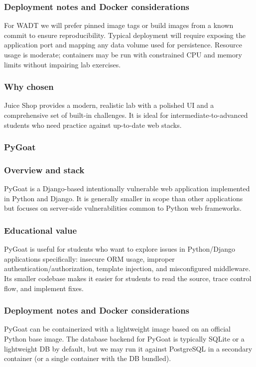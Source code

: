 \documentclass[12pt,titlepage]{article}
\begin{document}
\subsubsection*{Deployment notes and Docker considerations}
For WADT we will prefer pinned image tags or build images from a known commit to ensure reproducibility. Typical deployment will require exposing the application port and mapping any data volume used for persistence. Resource usage is moderate; containers may be run with constrained CPU and memory limits without impairing lab exercises.

\subsubsection*{Why chosen}
Juice Shop provides a modern, realistic lab with a polished UI and a comprehensive set of built-in challenges. It is ideal for intermediate-to-advanced students who need practice against up-to-date web stacks.


\subsubsection{PyGoat}

\subsubsection*{Overview and stack}
PyGoat is a Django-based intentionally vulnerable web application implemented in Python and Django. It is generally smaller in scope than other applications but focuses on server-side vulnerabilities common to Python web frameworks.

\subsubsection*{Educational value}
PyGoat is useful for students who want to explore issues in Python/Django applications specifically: insecure ORM usage, improper authentication/authorization, template injection, and misconfigured middleware. Its smaller codebase makes it easier for students to read the source, trace control flow, and implement fixes.

\subsubsection*{Deployment notes and Docker considerations}
PyGoat can be containerized with a lightweight image based on an official Python base image. The database backend for PyGoat is typically SQLite or a lightweight DB by default, but we may run it against PostgreSQL in a secondary container (or a single container with the DB bundled).
\end{document}
